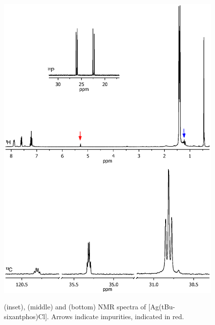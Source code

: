 \begin{figure}[htbp] 
\begin{center}
\vspace{0.5cm}
\includegraphics[trim = 2cm 6cm 2cm 2.5cm, clip]{../NMR/SitBuAgCl.eps}
\caption[NMR spectra for {[}Ag(tBu-sixantphos)Cl{]}]{\phosphorus{} (inset), \proton{} (middle) and \carbon{} (bottom) NMR spectra of {[}Ag(tBu-sixantphos)Cl{]}. Arrows indicate impurities,  indicated in red.}
\vspace{0.2cm}
\label{NMRAgCl}
\end{center}
\end{figure}
\vspace{0.2cm}

